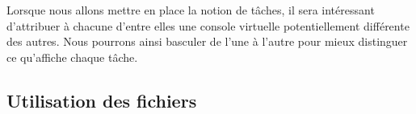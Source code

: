    Lorsque nous allons mettre en place la notion de tâches, il sera
intéressant d'attribuer à chacune d'entre elles une console virtuelle
potentiellement différente des autres. Nous pourrons ainsi basculer de
l'une à l'autre pour mieux distinguer ce qu'affiche chaque tâche.

%
\subsection{Utilisation des fichiers}

